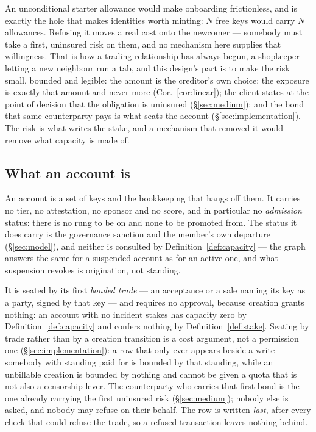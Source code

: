 \begin{remark}
\label{rem:friction}
An unconditional starter allowance would make onboarding frictionless, and is exactly
the hole that makes identities worth minting: $N$ free keys would carry $N$ allowances.
Refusing it moves a real cost onto the newcomer --- somebody must take a first, uninsured
risk on them, and no mechanism here supplies that willingness. That is how a trading
relationship has always begun, a shopkeeper letting a new neighbour run a tab, and this
design's part is to make the risk small, bounded and legible: the amount is the
creditor's own choice; the exposure is exactly that amount and never more
(Cor.~\ref{cor:linear}); the client states at the point of decision that the obligation
is uninsured (\S\ref{sec:medium}); and the bond that same counterparty pays is what seats
the account (\S\ref{sec:implementation}). The risk is what writes the stake, and a
mechanism that removed it would remove what capacity is made of.
\end{remark}

\subsection{What an account is}

An account is a set of keys and the bookkeeping that hangs off them. It carries no tier,
no attestation, no sponsor and no score, and in particular no \emph{admission} status:
there is no rung to be on and none to be promoted from. The status it does carry is the
governance sanction and the member's own departure (\S\ref{sec:model}), and neither is
consulted by Definition~\ref{def:capacity} --- the graph answers the same for a suspended
account as for an active one, and what suspension revokes is origination, not standing.

It is seated by its first \emph{bonded trade} --- an acceptance or a sale naming its key
as a party, signed by that key --- and requires no approval, because creation grants
nothing: an account with no incident stakes has capacity zero by
Definition~\ref{def:capacity} and confers nothing by Definition~\ref{def:stake}. Seating
by trade rather than by a creation transition is a cost argument, not a permission one
(\S\ref{sec:implementation}): a row that only ever appears beside a write somebody with
standing paid for is bounded by that standing, while an unbillable creation is bounded by
nothing and cannot be given a quota that is not also a censorship lever. The counterparty
who carries that first bond is the one already carrying the first uninsured risk
(\S\ref{sec:medium}); nobody else is asked, and nobody may refuse on their behalf. The
row is written \emph{last}, after every check that could refuse the trade, so a refused
transaction leaves nothing behind.

